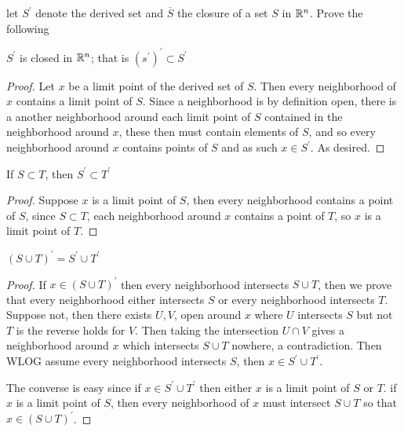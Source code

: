     \question
    let $S^\prime$ denote the derived set and $\overline{S}$ the closure of a set $S$ in $\mathbb{R}^n$. Prove the 
    following 

    \begin{alphaparts}
        \questionpart 
        $S^\prime$ is closed in $\mathbb{R}^n$; that is $(s^\prime)^\prime \subset S^\prime$ 

        \begin{proof}
            Let $x$ be a limit point of the derived set of $S$. Then every neighborhood of $x$ contains a limit 
            point of $S$. Since a neighborhood is by definition open, there is a another neighborhood around each limit point 
            of $S$ contained in the neighborhood around $x$, these then must contain elements of $S$, and so every neighborhood around $x$ 
            contains points of $S$ and as such $x \in S^\prime$. As desired. 
        \end{proof}

        \questionpart 
        If $S \subset T$, then $S^\prime \subset T^\prime$ 

        \begin{proof}
            Suppose $x$ is a limit point of $S$, then every neighborhood contains a point of $S$, 
            since $S \subset T$, each neighborhood around $x$ contains a point of $T$, so $x$ is a limit point of $T$. 

        \end{proof}

        \questionpart 
        $(S \cup T)^\prime = S^\prime \cup T^\prime$

        \begin{proof}
            If $x \in (S \cup T)^\prime$ then every neighborhood intersects $S \cup T$, 
            then we prove that every neighborhood either intersects $S$ or every neighborhood intersects $T$. Suppose 
            not, then there exists $U, V$, open around $x$ where $U$ intersects $S$ but not $T$ is the reverse holds for $V$. 
            Then taking the intersection $U \cap V$ gives a neighborhood around $x$ which intersects $S \cup T$ nowhere, a contradiction. 
            Then WLOG assume every neighborhood intersects $S$, then $x \in S^\prime \cup T^\prime$. 

            The converse is easy since if $x \in S^\prime \cup T^\prime$ then either $x$ is a limit point of $S$ or $T$. 
            if $x$ is a limit point of $S$, then every neighborhood of $x$ must intersect $S \cup T$ so that $x \in (S \cup T)^\prime$. 


\end{proof}
\end{alphaparts}

